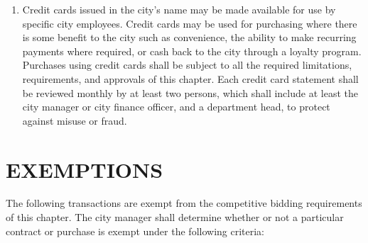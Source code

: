 \begin{enumerate}
\begin{enumerate}
		\end{enumerate}
	\item Credit cards issued in the city’s name may be made available for use by specific city employees.  Credit cards may be used for purchasing where there is some benefit to the city such as convenience, the ability to make recurring payments where required, or cash back to the city through a loyalty program.  Purchases using credit cards shall be subject to all the required limitations, requirements, and approvals of this chapter.  Each credit card statement shall be reviewed monthly by at least two persons, which shall include at least the city manager or city finance officer, and a department head, to protect against misuse or fraud.
\end{enumerate}

\pagebreak

\section{EXEMPTIONS}
The following transactions are exempt from the competitive bidding requirements of this chapter. The city manager shall determine whether or not a particular contract or purchase is exempt under the following criteria:


